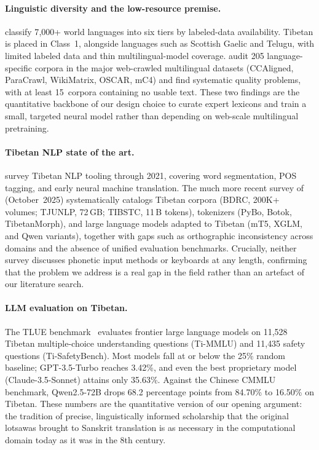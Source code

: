 \documentclass[11pt]{article}
\begin{document}
\paragraph{Linguistic diversity and the low-resource premise.}
\citet{joshi2020state} classify 7{,}000+ world languages into six tiers by labeled-data availability. Tibetan is placed in Class~1, alongside languages such as Scottish Gaelic and Telugu, with limited labeled data and thin multilingual-model coverage. \citet{kreutzer2022quality} audit 205 language-specific corpora in the major web-crawled multilingual datasets (CCAligned, ParaCrawl, WikiMatrix, OSCAR, mC4) and find systematic quality problems, with at least 15~corpora containing no usable text. These two findings are the quantitative backbone of our design choice to curate expert lexicons and train a small, targeted neural model rather than depending on web-scale multilingual pretraining.

\paragraph{Tibetan NLP state of the art.}
\citet{long2021recent} survey Tibetan NLP tooling through 2021, covering word segmentation, POS tagging, and early neural machine translation. The much more recent survey of~\citet{tibetanai2025survey} (October~2025) systematically catalogs Tibetan corpora (BDRC, 200K+ volumes; TJUNLP, 72\,GB; TIBSTC, 11\,B tokens), tokenizers (PyBo, Botok, TibetanMorph), and large language models adapted to Tibetan (mT5, XGLM, and Qwen variants), together with gaps such as orthographic inconsistency across domains and the absence of unified evaluation benchmarks. Crucially, neither survey discusses phonetic input methods or keyboards at any length, confirming that the problem we address is a real gap in the field rather than an artefact of our literature search.

\paragraph{LLM evaluation on Tibetan.}
The TLUE benchmark~\cite{tlue2025} evaluates frontier large language models on 11{,}528 Tibetan multiple-choice understanding questions (Ti-MMLU) and 11{,}435 safety questions (Ti-SafetyBench). Most models fall at or below the 25\% random baseline; GPT-3.5-Turbo reaches 3.42\%, and even the best proprietary model (Claude-3.5-Sonnet) attains only 35.63\%. Against the Chinese CMMLU benchmark, Qwen2.5-72B drops 68.2 percentage points from 84.70\% to 16.50\% on Tibetan. These numbers are the quantitative version of our opening argument: the tradition of precise, linguistically informed scholarship that the original lotsawas brought to Sanskrit translation is as necessary in the computational domain today as it was in the 8th century.
\end{document}
